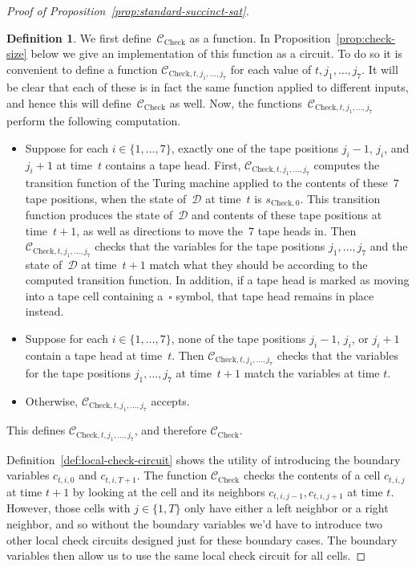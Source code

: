 \documentclass[11pt]{article}
\theoremstyle{definition}
\newtheorem{definition}[theorem]{Definition}
\newcommand{\decider}{\mathcal{D}}
\newcommand{\circuit}{\mathcal{C}}
\begin{document}
\begin{proof}[Proof of Proposition~\ref{prop:standard-succinct-sat}]
\begin{definition}
    We first define~$\circuit_{\mathrm{Check}}$ as a function. In Proposition~\ref{prop:check-size} below we give an implementation of this function as a circuit. To do so it is convenient to define a function $\circuit_{\mathrm{Check},
      t, j_1, \ldots, j_7}$ for each value of $t, j_1, \ldots, j_7$.
    It will be clear that each of these is in fact the same function
    applied to different inputs, and hence this will
    define~$\circuit_{\mathrm{Check}}$ as well.
    Now, the functions~$\circuit_{\mathrm{Check}, t, j_1, \ldots, j_7}$ perform the following computation. 
    \begin{itemize}
    \item Suppose for each $i \in \{1, \ldots, 7\}$, exactly one of the tape
      positions $j_i-1$, $j_i$, and $j_i+1$ at time~$t$ contains a tape head.
      First, $\circuit_{\mathrm{Check}, t, j_1, \ldots, j_7}$ computes the
      transition function of the Turing machine applied to the contents of
      these~$7$ tape positions, when  the state of~$\decider$ at time~$t$ is $s_{\mathrm{Check}, 0}$. This transition function 
      produces the state of~$\decider$ and contents of these tape positions at
      time~$t+1$, as well as directions to move the~$7$ tape heads in.
      Then $\circuit_{\mathrm{Check}, t, j_1, \ldots, j_7}$ checks that the
      variables for the tape positions $j_1, \ldots, j_7$ and the state
      of~$\decider$ at time~$t+1$ match what they should be according to the computed transition function.
      In addition, if a tape head is marked as moving into a tape cell
      containing a~$\square$ symbol, that tape head remains in place instead.
    \item Suppose for each $i \in \{1, \ldots, 7\}$, none of the tape positions
      $j_i -1$, $j_i$, or $j_i+1$ contain a tape head at time~$t$.
      Then $\circuit_{\mathrm{Check}, t, j_1, \ldots, j_7}$ checks that the
      variables for the tape positions $j_1, \ldots, j_7$ at time~$t+1$ match
      the variables at time $t$.
    \item Otherwise, $\circuit_{\mathrm{Check}, t, j_1, \ldots, j_7}$ accepts.
    \end{itemize}
    This defines $\circuit_{\mathrm{Check}, t, j_1, \ldots, j_7}$, and therefore
    $\circuit_{\mathrm{Check}}$.
  \end{definition}

  Definition~\ref{def:local-check-circuit} shows the utility of introducing the
  boundary variables $c_{t, i, 0}$ and $c_{t, i, T+1}$.
  The function $\circuit_{\mathrm{Check}}$ checks the contents of a cell $c_{t,
    i, j}$ at time $t+1$ by looking at the cell and its neighbors $c_{t, i,
    j-1}, c_{t, i, j+1}$ at time $t$.
  However, those cells with $j \in \{1, T\}$ only have either a left neighbor or
  a right neighbor, and so without the boundary variables we'd have to introduce
  two other local check circuits designed just for these boundary cases.
  The boundary variables then allow us to use the same local check circuit for
  all cells.


\end{proof}
\end{document}

